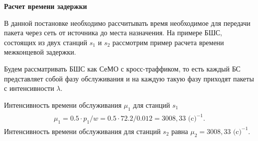 
      


      

\textbf{Расчет времени задержки}

В данной постановке необходимо рассчитывать время необходимое для передачи пакета через сеть от источника до места назначения. На примере БШС, состоящих из двух станций $s_1$ и $s_2$ рассмотрим пример расчета времени межконцевой задержки.

Будем рассматривать БШС как СеМО с кросс-траффиком, то есть каждый БС представляет собой фазу обслуживания и на каждую такую фазу приходят пакеты с интенсивности $\lambda$.

Интенсивность времени обслуживания $\mu_1$ для станций $s_1$ 
\begin{align}
  \begin{aligned}
  \mu_1 = 0.5 \cdot p_1 / w = 0.5 \cdot 72.2 / 0.012 = 3008,33 \text{ (c)}^{-1}.
\end{aligned}
\end{align}
Интенсивность времени обслуживания для станций $s_2$ равна $\mu_2 = 3008,33 \text{ (c)}^{-1}$.

